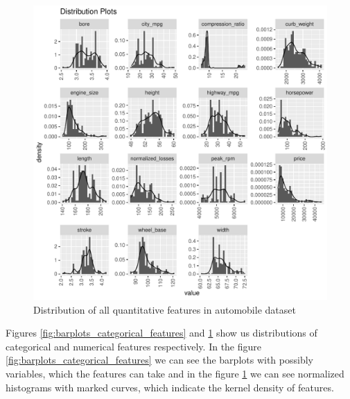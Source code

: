 \documentclass[11pt,a4paper]{article}\usepackage[]{graphicx}\usepackage[]{xcolor}
\makeatletter
\def\maxwidth{ %
  \ifdim\Gin@nat@width>\linewidth
    \linewidth
  \else
    \Gin@nat@width
  \fi
}
\newenvironment{knitrout}{}{} %
\makeatother
\begin{document}
\begin{knitrout}
\color{fgcolor}\begin{figure}
\includegraphics[width=\maxwidth]{figure/hisrograms_numeric_features-1} \caption[Distribution of all quantitative features in automobile dataset]{Distribution of all quantitative features in automobile dataset}\label{fig:hisrograms_numeric_features}
\end{figure}

\end{knitrout}
	
	Figures \ref{fig:barplots_categorical_features} and \ref{fig:hisrograms_numeric_features} show us distributions of categorical and numerical features respectively. In the figure \ref{fig:barplots_categorical_features} we can see the barplots with possibly variables, which the features can take and in the figure \ref{fig:hisrograms_numeric_features} we can see normalized histograms with marked curves, which indicate the kernel density of features.
	
\end{document}
